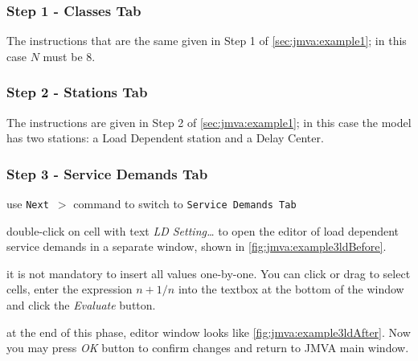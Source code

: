 \subsubsection{Step 1 - Classes Tab}

The instructions that are the same given in Step 1 of
\autoref{sec:jmva:example1}; in this case $N$ must be 8.

\subsubsection{Step 2 - Stations Tab}

The instructions are given in Step 2 of \autoref{sec:jmva:example1};
in this case the model has two stations: a Load Dependent station
and a Delay Center.

\subsubsection{Step 3 - Service Demands Tab}

\begin{enumerate*}
\item use \texttt{Next $>$} command to switch to \texttt{Service Demands Tab}
\item double-click on cell with text \emph{LD Setting\dots}
to open the editor of load dependent service demands in a separate
window, shown in \autoref{fig:jmva:example3ldBefore}.
\item it is not mandatory to insert all values one-by-one. You can
click or drag to select cells, enter the expression $n + 1/n$ into
the textbox at the bottom of the window and click the
\emph{Evaluate} button.
\item at the end of this phase, editor window looks like
\autoref{fig:jmva:example3ldAfter}. Now you may press \emph{OK}
button to confirm changes and return to JMVA main window.
\end{enumerate*}

